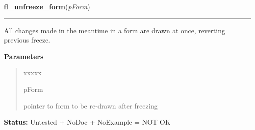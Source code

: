 \hspace{.8\funcindent}\begin{boxedminipage}{\funcwidth}

    \raggedright \textbf{fl\_unfreeze\_form}(\textit{pForm})

    \vspace{-1.5ex}

    \rule{\textwidth}{0.5\fboxrule}
\setlength{\parskip}{2ex}
    All changes made in the meantime in a form are drawn at once, reverting
    previous freeze.

\setlength{\parskip}{1ex}
      \textbf{Parameters}
      \vspace{-1ex}

      \begin{quote}
        \begin{Ventry}{xxxxx}

          \item[pForm]

          pointer to form to be re-drawn after freezing

        \end{Ventry}

      \end{quote}

\textbf{Status:} Untested + NoDoc + NoExample = NOT OK



    \end{boxedminipage}

    \label{xformslib:library:fl_deactivate_form}

    \vspace{0.5ex}

